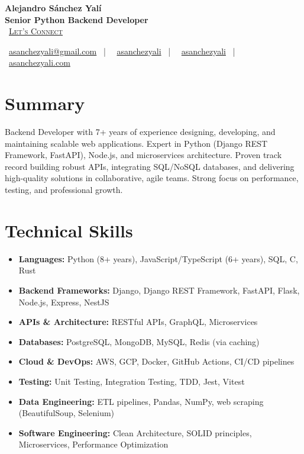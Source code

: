 \documentclass[letterpaper,11pt]{article}
\newcommand{\normalfaCalendar}{{\mdseries\faCalendar}}
\newcommand{\normalfaEnvelope}{{\mdseries\faEnvelope}}
\newcommand{\normalfaLinkedin}{{\mdseries\faLinkedin}}
\newcommand{\normalfaGithub}{{\mdseries\faGithub}}
\newcommand{\normalfaGlobe}{{\mdseries\faGlobe}}
\begin{document}
\begin{center}
\textbf{\Huge Alejandro Sánchez Yalí}\\[0.2em]
\textbf{\Large Senior Python Backend Developer}\\[0.4em]
\small
\normalfaCalendar\ \href{https://cal.com/asanchezyali/full-time-opportunities}{\textsc{Let's Connect}}

\vspace{0.8em}
\normalfaEnvelope\ \href{mailto:asanchezyali@gmail.com}{asanchezyali@gmail.com}  ~|~
\normalfaLinkedin\ \href{https://www.linkedin.com/in/asanchezyali}{asanchezyali} ~|~
\normalfaGithub\ \href{https://github.com/asanchezyali}{asanchezyali}  ~|~
\normalfaGlobe\ \href{https://asanchezyali.com}{asanchezyali.com}
\end{center}

\section{Summary}
Backend Developer with 7+ years of experience designing, developing, and maintaining scalable web applications. Expert in Python (Django REST Framework, FastAPI), Node.js, and microservices architecture. Proven track record building robust APIs, integrating SQL/NoSQL databases, and delivering high-quality solutions in collaborative, agile teams. Strong focus on performance, testing, and professional growth.

\section{Technical Skills}
\begin{itemize}[leftmargin=*, itemsep=0pt]
  \item \textbf{Languages:} Python (8+ years), JavaScript/TypeScript (6+ years), SQL, C, Rust
  \item \textbf{Backend Frameworks:} Django, Django REST Framework, FastAPI, Flask, Node.js, Express, NestJS
  \item \textbf{APIs \& Architecture:} RESTful APIs, GraphQL, Microservices
  \item \textbf{Databases:} PostgreSQL, MongoDB, MySQL, Redis (via caching)
  \item \textbf{Cloud \& DevOps:} AWS, GCP, Docker, GitHub Actions, CI/CD pipelines
  \item \textbf{Testing:} Unit Testing, Integration Testing, TDD, Jest, Vitest
  \item \textbf{Data Engineering:} ETL pipelines, Pandas, NumPy, web scraping (BeautifulSoup, Selenium)
  \item \textbf{Software Engineering:} Clean Architecture, SOLID principles, Microservices, Performance Optimization
\end{itemize}
\end{document}
